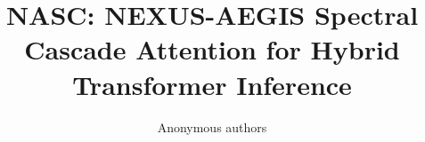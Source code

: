 \title{\textbf{NASC: NEXUS-AEGIS Spectral Cascade Attention for Hybrid Transformer Inference}}

\author{Anonymous authors}

